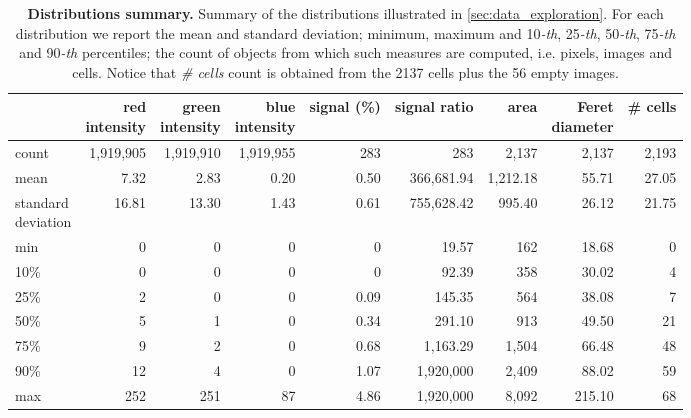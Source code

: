 \begin{table}[]
{    \begin{tabular}{lrrrrrrrr}
    \toprule
    {} &          \thead{red\\intensity} &        \thead{green\\intensity} &         \thead{blue\\intensity} &  signal (\%) &  signal ratio &     area &  \thead{Feret\\diameter} &  \# cells \\
    \midrule
    count & 1,919,905 & 1,919,910 & 1,919,955 &      283 &        283 & 2,137 &        2,137 & 2,193 \\
    mean  &         7.32 &         2.83 &         0.20 &        0.50 &    366,681.94 & 1,212.18 &           55.71 &    27.05 \\
    \thead{standard\\deviation}   &        16.81 &        13.30 &         1.43 &        0.61 &    755,628.42 &   995.40 &           26.12 &    21.75 \\
    min   &         0 &         0 &         0 &        0 &         19.57 &   162 &           18.68 &     0 \\
    10\%   &         0 &         0 &         0 &        0 &         92.39 &   358 &           30.02 &     4 \\
    25\%   &         2 &         0 &         0 &        0.09 &        145.35 &   564 &           38.08 &     7 \\
    50\%   &         5 &         1 &         0 &        0.34 &        291.10 &   913 &           49.50 &    21 \\
    75\%   &         9 &         2 &         0 &        0.68 &      1,163.29 & 1,504 &           66.48 &    48 \\
    90\%   &        12 &         4 &         0 &        1.07 &  1,920,000 & 2,409 &           88.02 &    59 \\
    max   &       252 &       251 &        87 &        4.86 &  1,920,000 & 8,092 &          215.10 &    68 \\
    \bottomrule
    \end{tabular}
    }
    \caption{\textbf{Distributions summary.} 
    Summary of the distributions illustrated in \cref{sec:data_exploration}. For each distribution we report the mean and standard deviation; minimum, maximum and 10\textit{-th}, 25\textit{-th}, 50\textit{-th}, 75\textit{-th} and 90\textit{-th} percentiles; the count of objects from which such measures are computed, i.e. pixels, images and cells.
    Notice that \textit{\# cells} count is obtained from the 2137 cells plus the 56 empty images.
    }
    \label{tab:data_features}
\end{table}

